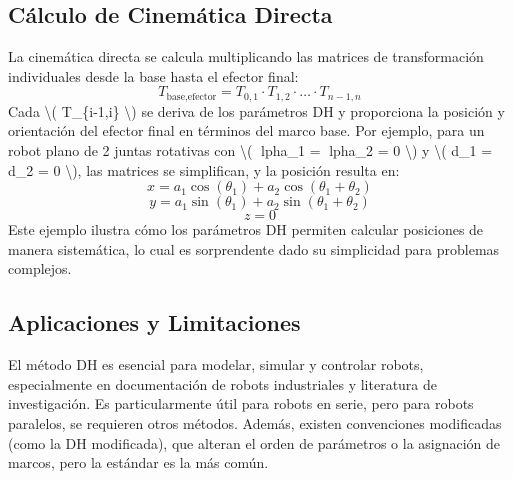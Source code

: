 \documentclass{article}%
\begin{document}
\subsection{Cálculo de Cinemática Directa}%
\label{subsec:ClculodeCinemticaDirecta}%
La cinemática directa se calcula multiplicando las matrices de transformación individuales desde la base hasta el efector final:\newline%
%
\[%
T_{\text{base,efector}} = T_{0,1} \cdot T_{1,2} \cdot \ldots \cdot T_{n-1,n}%
\]%
Cada \textbackslash{}( T\_\{i{-}1,i\} \textbackslash{}) se deriva de los parámetros DH y proporciona la posición y orientación del efector final en términos del marco base. Por ejemplo, para un robot plano de 2 juntas rotativas con \textbackslash{}( lpha\_1 = lpha\_2 = 0 \textbackslash{}) y \textbackslash{}( d\_1 = d\_2 = 0 \textbackslash{}), las matrices se simplifican, y la posición resulta en:\newline%
%
\[%
x = a_1 \cos(\theta_1) + a_2 \cos(\theta_1 + \theta_2)%
\]%
\[%
y = a_1 \sin(\theta_1) + a_2 \sin(\theta_1 + \theta_2)%
\]%
\[%
z = 0%
\]%
Este ejemplo ilustra cómo los parámetros DH permiten calcular posiciones de manera sistemática, lo cual es sorprendente dado su simplicidad para problemas complejos.\newline%

%
\subsection{Aplicaciones y Limitaciones}%
\label{subsec:AplicacionesyLimitaciones}%
El método DH es esencial para modelar, simular y controlar robots, especialmente en documentación de robots industriales y literatura de investigación. Es particularmente útil para robots en serie, pero para robots paralelos, se requieren otros métodos. Además, existen convenciones modificadas (como la DH modificada), que alteran el orden de parámetros o la asignación de marcos, pero la estándar es la más común.\newline%

%
\end{document}
